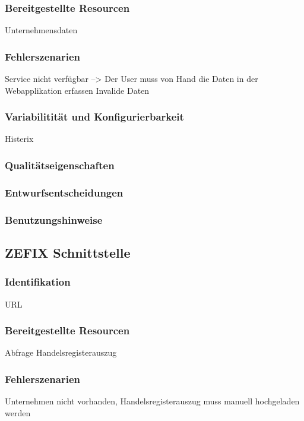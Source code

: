 \subsubsection{Bereitgestellte Resourcen}
Unternehmensdaten

\subsubsection{Fehlerszenarien}
Service nicht verfügbar --> Der User muss von Hand die Daten in der Webapplikation erfassen
Invalide Daten

\subsubsection{Variabilitität und Konfigurierbarkeit}
Histerix

\subsubsection{Qualitätseigenschaften}

\subsubsection{Entwurfsentscheidungen} 

\subsubsection{Benutzungshinweise} 

\subsection{ZEFIX Schnittstelle}

\subsubsection{Identifikation}
URL
\subsubsection{Bereitgestellte Resourcen}
Abfrage Handelsregisterauszug

\subsubsection{Fehlerszenarien}
Unternehmen nicht vorhanden, Handelsregisterauszug muss manuell hochgeladen werden


